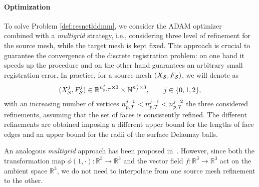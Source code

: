 \paragraph{Optimization} To solve Problem \eqref{def:resnetlddmm}, we consider the ADAM optimizer~\cite{kingma2014adam} combined with a \textit{multigrid} strategy, i.e., considering
three level of refinement for the source mesh, while the target mesh is kept fixed. 
This approach is crucial to guarantee 
the convergence of the discrete registration problem: on one hand it speeds up the procedure and on the other hand guarantees an arbitrary small registration error. 
In practice, for a source mesh $(X_{\mathcal S},F_{\mathcal S})$, we will denote as
\begin{equation*}
(X_{\mathcal S}^{j}, F_{\mathcal S}^{j})\in\mathbb{R}^{n_{p,\mathcal T}^{j}\times 3}\times\mathbb{N}^{n_f^{j}\times 3},\qquad j\in\{0, 1 , 2\},
\end{equation*}
with an increasing number of vertices $n_{p,\mathcal T}^{j=0} < n_{p,\mathcal T}^{j=1} < n_{p,\mathcal T}^{j=2}$ the three considered refinements, assuming that the set of faces is consistently refined.
The different refinements are obtained imposing a different upper bound for the lengths of face edges and an upper bound for the radii of the surface Delaunay balls. 


An analogous \textit{multigrid} approach has been proposed in~\cite{scarpolini2023enabling}. However, since both the transformation map 
$\phi(1, \cdot):\mathbb{R}^3\rightarrow\mathbb{R}^3$ and the vector field $f:\mathbb{R}^3\rightarrow\mathbb{R}^3$ act on the ambient space $\mathbb{R}^3$, we do not need to interpolate from one source mesh refinement to the other. 

